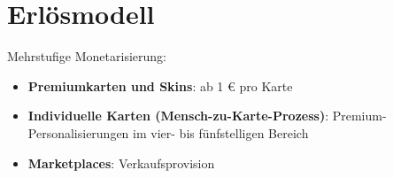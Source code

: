 \documentclass[fontsize=12]{scrartcl}
\begin{document}
	
	
	
	
		
		
		
	
	\section{Erlösmodell} \label{sec:Erloesmodell}
	
	Mehrstufige Monetarisierung:
	
	\begin{itemize}
		
		\item \textbf{Premiumkarten und Skins}: ab 1 € pro Karte
		
		\item \textbf{Individuelle Karten (Mensch-zu-Karte-Prozess)}: Premium-Personalisierungen im vier- bis fünfstelligen Bereich
		
		
		\item \textbf{Marketplaces}: Verkaufsprovision
		
		
	\end{itemize}
	
\end{document}
